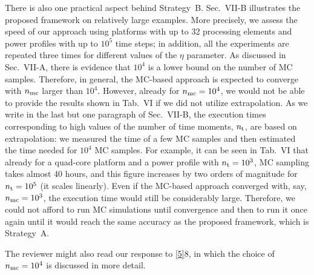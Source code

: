 \begin{authors}
There is also one practical aspect behind Strategy~B.
Sec.~VII-B illustrates the proposed framework on relatively large examples.
More precisely, we assess the speed of our approach using platforms with up to 32 processing elements and power profiles with up to $10^5$ time steps; in addition, all the experiments are repeated three times for different values of the $\eta$ parameter.
As discussed in Sec.~VII-A, there is evidence that $10^4$ is a lower bound on the number of MC samples.
Therefore, in general, the MC-based approach is expected to converge with ${n_\text{mc}}$ larger than $10^4$.
However, already for ${n_\text{mc}} = 10^4$, we would not be able to provide the results shown in Tab.~VI if we did not utilize extrapolation.
As we write in the last but one paragraph of Sec.~VII-B, the execution times corresponding to high values of the number of time moments, ${n_\text{t}}$, are based on extrapolation: we measured the time of a few MC samples and then estimated the time needed for $10^4$ MC samples.
For example, it can be seen in Tab.~VI that already for a quad-core platform and a power profile with ${n_\text{t}} = 10^3$, MC sampling takes almost 40 hours, and this figure increases by two orders of magnitude for ${n_\text{t}} = 10^5$ (it scales linearly).
Even if the MC-based approach converged with, say, ${n_\text{mc}} = 10^3$, the execution time would still be considerably large.
Therefore, we could not afford to run MC simulations until convergence and then to run it once again until it would reach the same accuracy as the proposed framework, which is Strategy~A.

The reviewer might also read our response to \cref{5}{8}, in which the choice of ${n_\text{mc}} = 10^4$ is discussed in more detail.

\begin{actions}
\end{actions}
\end{authors}

